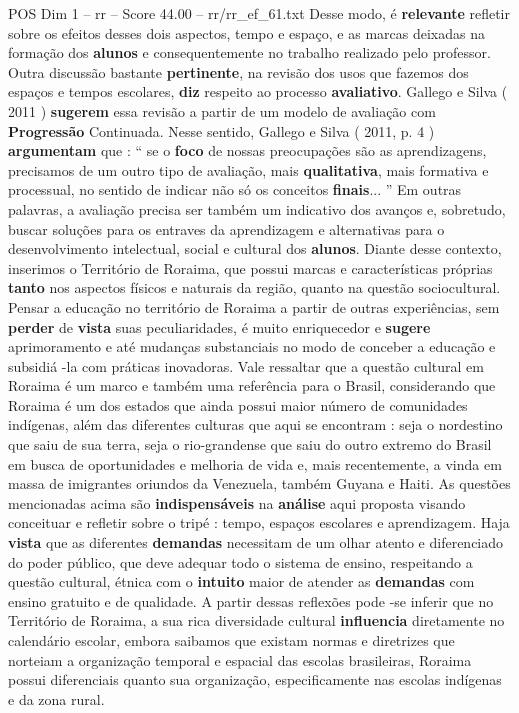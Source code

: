 \begin{textsample}{POS Dim 1 – rr – Score 44.00 – rr/rr\_ef\_61.txt}
Desse modo, é \textbf{relevante} refletir sobre os efeitos desses dois aspectos, tempo e espaço, e as marcas deixadas na formação dos \textbf{alunos} e consequentemente no trabalho realizado pelo professor.
Outra discussão bastante \textbf{pertinente}, na revisão dos usos que fazemos dos espaços e tempos escolares, \textbf{diz} respeito ao processo \textbf{avaliativo}.
Gallego e Silva ( 2011 ) \textbf{sugerem} essa revisão a partir de um modelo de avaliação com \textbf{Progressão} Continuada.
Nesse sentido, Gallego e Silva ( 2011, p. 4 ) \textbf{argumentam} que : “ se o \textbf{foco} de nossas preocupações são as aprendizagens, precisamos de um outro tipo de avaliação, mais \textbf{qualitativa}, mais formativa e processual, no sentido de indicar não só os conceitos \textbf{finais}... ” Em outras palavras, a avaliação precisa ser também um indicativo dos avanços e, sobretudo, buscar soluções para os entraves da aprendizagem e alternativas para o desenvolvimento intelectual, social e cultural dos \textbf{alunos}.
Diante desse contexto, inserimos o Território de Roraima, que possui marcas e características próprias \textbf{tanto} nos aspectos físicos e naturais da região, quanto na questão sociocultural.
Pensar a educação no território de Roraima a partir de outras experiências, sem \textbf{perder} de \textbf{vista} suas peculiaridades, é muito enriquecedor e \textbf{sugere} aprimoramento e até mudanças substanciais no modo de conceber a educação e subsidiá -la com práticas inovadoras.
Vale ressaltar que a questão cultural em Roraima é um marco e também uma referência para o Brasil, considerando que Roraima é um dos estados que ainda possui maior número de comunidades indígenas, além das diferentes culturas que aqui se encontram : seja o nordestino que saiu de sua terra, seja o rio-grandense que saiu do outro extremo do Brasil em busca de oportunidades e melhoria de vida e, mais recentemente, a vinda em massa de imigrantes oriundos da Venezuela, também Guyana e Haiti.
As questões mencionadas acima são \textbf{indispensáveis} na \textbf{análise} aqui proposta visando conceituar e refletir sobre o tripé : tempo, espaços escolares e aprendizagem.
Haja \textbf{vista} que as diferentes \textbf{demandas} necessitam de um olhar atento e diferenciado do poder público, que deve adequar todo o sistema de ensino, respeitando a questão cultural, étnica com o \textbf{intuito} maior de atender as \textbf{demandas} com ensino gratuito e de qualidade.
A partir dessas reflexões pode -se inferir que no Território de Roraima, a sua rica diversidade cultural \textbf{influencia} diretamente no calendário escolar, embora saibamos que existam normas e diretrizes que norteiam a organização temporal e espacial das escolas brasileiras, Roraima possui diferenciais quanto sua organização, especificamente nas escolas indígenas e da zona rural.

\end{textsample}
